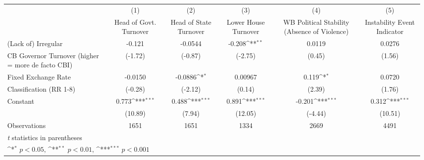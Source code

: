 {
\def\sym#1{\ifmmode^{#1}\else\(^{#1}\)\fi}
\begin{tabular}{l*{5}{c}}
\hline\hline
                    &\multicolumn{1}{c}{(1)}&\multicolumn{1}{c}{(2)}&\multicolumn{1}{c}{(3)}&\multicolumn{1}{c}{(4)}&\multicolumn{1}{c}{(5)}\\
                    &\multicolumn{1}{c}{Head of Govt. Turnover}&\multicolumn{1}{c}{Head of State Turnover}&\multicolumn{1}{c}{Lower House Turnover}&\multicolumn{1}{c}{WB Political Stability (Absence of Violence)}&\multicolumn{1}{c}{Instability Event Indicator}\\
\hline
(Lack of) Irregular &      -0.121         &     -0.0544         &      -0.208\sym{**} &      0.0119         &      0.0276         \\
CB Governor Turnover (higher = more de facto CBI)&     (-1.72)         &     (-0.87)         &     (-2.75)         &      (0.45)         &      (1.56)         \\
[1em]
Fixed Exchange Rate &     -0.0150         &     -0.0886\sym{*}  &     0.00967         &       0.119\sym{*}  &      0.0720         \\
Classification (RR 1-8)&     (-0.28)         &     (-2.12)         &      (0.14)         &      (2.39)         &      (1.76)         \\
[1em]
Constant            &       0.773\sym{***}&       0.488\sym{***}&       0.891\sym{***}&      -0.201\sym{***}&       0.312\sym{***}\\
                    &     (10.89)         &      (7.94)         &     (12.05)         &     (-4.44)         &     (10.51)         \\
\hline
Observations        &        1651         &        1651         &        1334         &        2669         &        4491         \\
\hline\hline
\multicolumn{6}{l}{\footnotesize \textit{t} statistics in parentheses}\\
\multicolumn{6}{l}{\footnotesize \sym{*} \(p<0.05\), \sym{**} \(p<0.01\), \sym{***} \(p<0.001\)}\\
\end{tabular}
}
